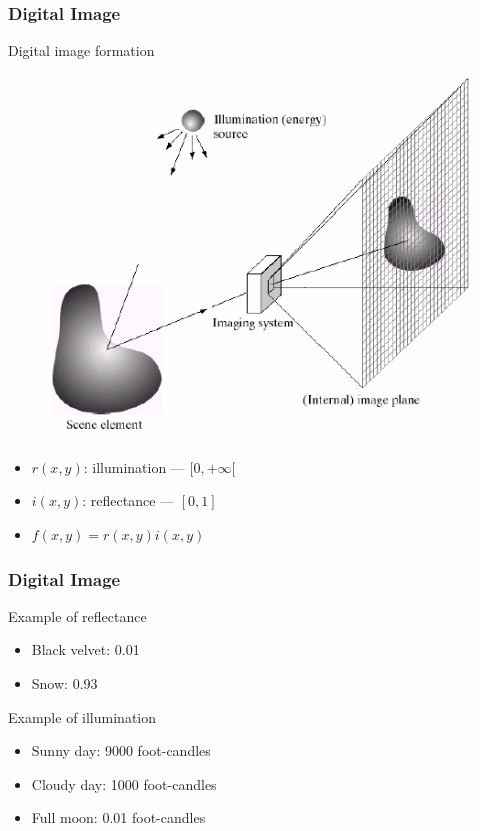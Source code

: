 \documentclass[table]{beamer}
\begin{document}
\begin{frame}
  \frametitle{Digital Image}
    \begin{block}{Digital image formation}
        \begin{figure}
        \centering
        \includegraphics[height=.4\textheight]{./images/img_form.png}
      \end{figure}
      \begin{itemize}\scriptsize
        \item<1-> $r(x,y)$: illumination --- $[0, +\infty[$
        \item<2-> $i(x,y)$: reflectance --- $[0,1]$
        \item<3-> $f(x,y) = r(x,y) i(x,y)$
        \end{itemize}
    \end{block}
\end{frame}

\begin{frame}
  \frametitle{Digital Image}
    \begin{block}{Example of reflectance}
      \begin{itemize}\scriptsize
        \item Black velvet: 0.01
        \item Snow: 0.93
        \end{itemize}
    \end{block}
    \begin{block}{Example of illumination}
      \begin{itemize}\scriptsize
        \item Sunny day: 9000 foot-candles
        \item Cloudy day: 1000 foot-candles
        \item Full moon: 0.01 foot-candles
        \end{itemize}
    \end{block}
\end{frame}
\end{document}
